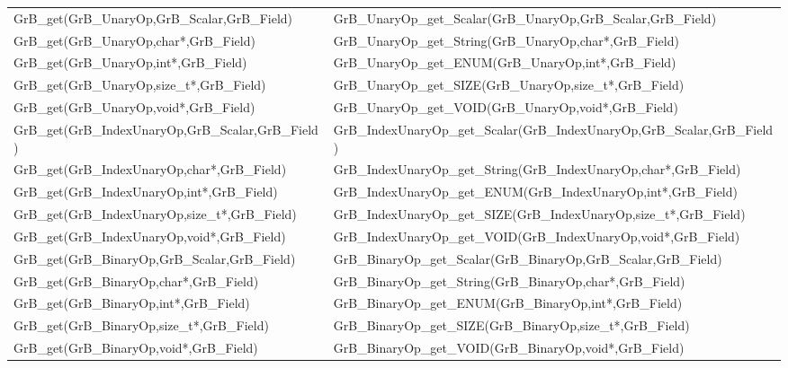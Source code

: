 \begin{table}[htb]
{\begin{tabular}{l|l}
{\sf GrB\_get(GrB\_UnaryOp,GrB\_Scalar,GrB\_Field)}  & {\sf GrB\_UnaryOp\_get\_Scalar(GrB\_UnaryOp,GrB\_Scalar,GrB\_Field)} \\
{\sf GrB\_get(GrB\_UnaryOp,char*,GrB\_Field)}        & {\sf GrB\_UnaryOp\_get\_String(GrB\_UnaryOp,char*,GrB\_Field)}       \\
{\sf GrB\_get(GrB\_UnaryOp,int*,GrB\_Field)}           & {\sf GrB\_UnaryOp\_get\_ENUM(GrB\_UnaryOp,int*,GrB\_Field)}        \\
{\sf GrB\_get(GrB\_UnaryOp,size\_t*,GrB\_Field)}       & {\sf GrB\_UnaryOp\_get\_SIZE(GrB\_UnaryOp,size\_t*,GrB\_Field)}    \\
{\sf GrB\_get(GrB\_UnaryOp,void*,GrB\_Field)}          & {\sf GrB\_UnaryOp\_get\_VOID(GrB\_UnaryOp,void*,GrB\_Field)}       \\
\hline

{\sf GrB\_get(GrB\_IndexUnaryOp,GrB\_Scalar,GrB\_Field)}  & {\sf GrB\_IndexUnaryOp\_get\_Scalar(GrB\_IndexUnaryOp,GrB\_Scalar,GrB\_Field)} \\
{\sf GrB\_get(GrB\_IndexUnaryOp,char*,GrB\_Field)}        & {\sf GrB\_IndexUnaryOp\_get\_String(GrB\_IndexUnaryOp,char*,GrB\_Field)}       \\
{\sf GrB\_get(GrB\_IndexUnaryOp,int*,GrB\_Field)}           & {\sf GrB\_IndexUnaryOp\_get\_ENUM(GrB\_IndexUnaryOp,int*,GrB\_Field)}        \\
{\sf GrB\_get(GrB\_IndexUnaryOp,size\_t*,GrB\_Field)}       & {\sf GrB\_IndexUnaryOp\_get\_SIZE(GrB\_IndexUnaryOp,size\_t*,GrB\_Field)}    \\
{\sf GrB\_get(GrB\_IndexUnaryOp,void*,GrB\_Field)}          & {\sf GrB\_IndexUnaryOp\_get\_VOID(GrB\_IndexUnaryOp,void*,GrB\_Field)}       \\
\hline

{\sf GrB\_get(GrB\_BinaryOp,GrB\_Scalar,GrB\_Field)}  & {\sf GrB\_BinaryOp\_get\_Scalar(GrB\_BinaryOp,GrB\_Scalar,GrB\_Field)} \\
{\sf GrB\_get(GrB\_BinaryOp,char*,GrB\_Field)}        & {\sf GrB\_BinaryOp\_get\_String(GrB\_BinaryOp,char*,GrB\_Field)}       \\
{\sf GrB\_get(GrB\_BinaryOp,int*,GrB\_Field)}           & {\sf GrB\_BinaryOp\_get\_ENUM(GrB\_BinaryOp,int*,GrB\_Field)}        \\
{\sf GrB\_get(GrB\_BinaryOp,size\_t*,GrB\_Field)}       & {\sf GrB\_BinaryOp\_get\_SIZE(GrB\_BinaryOp,size\_t*,GrB\_Field)}    \\
{\sf GrB\_get(GrB\_BinaryOp,void*,GrB\_Field)}          & {\sf GrB\_BinaryOp\_get\_VOID(GrB\_BinaryOp,void*,GrB\_Field)}       \\
\hline


\end{tabular}}
\end{table}
